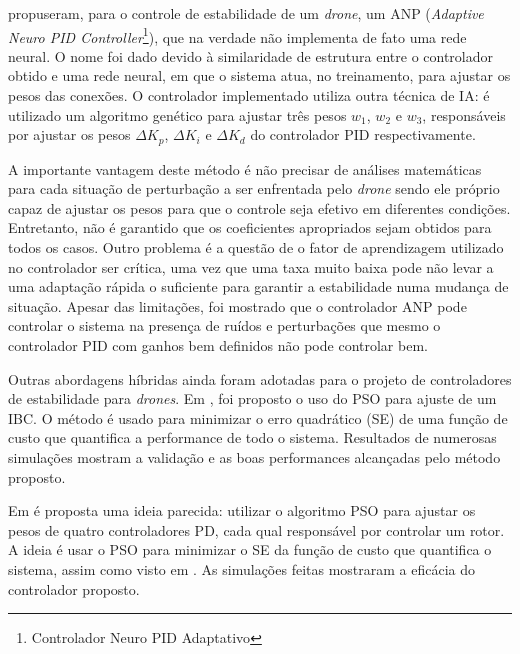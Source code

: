  propuseram, para o controle de estabilidade de um \textit{drone}, um ANP (\textit{Adaptive Neuro PID Controller}\footnote{Controlador Neuro PID Adaptativo}), que na verdade não implementa de fato uma rede neural. O nome foi dado devido à similaridade de estrutura entre o controlador obtido e uma rede neural, em que o sistema atua, no treinamento, para ajustar os pesos das conexões. O controlador implementado utiliza outra técnica de IA: é utilizado um algoritmo genético para ajustar três pesos $w_1$, $w_2$ e $w_3$, responsáveis por ajustar os pesos $\Delta K_p$, $\Delta K_i$ e $\Delta K_d$ do controlador PID respectivamente.

A importante vantagem deste método é não precisar de análises matemáticas para cada situação de perturbação a ser enfrentada pelo \textit{drone} sendo ele próprio capaz de ajustar os pesos para que o controle seja efetivo em diferentes condições. Entretanto, não é garantido que os coeficientes apropriados sejam obtidos para todos os casos. Outro problema é a questão de o fator de aprendizagem utilizado no controlador ser crítica, uma vez que uma taxa muito baixa pode não levar a uma adaptação rápida o suficiente para garantir a estabilidade numa mudança de situação. Apesar das limitações, foi mostrado que o controlador ANP pode controlar o sistema na presença de ruídos e perturbações que mesmo o controlador PID com ganhos bem definidos não pode controlar bem.

Outras abordagens híbridas ainda foram adotadas para o projeto de controladores de estabilidade para \textit{drones}. Em \cite{Yacef2013}, foi proposto o uso do PSO para ajuste de um IBC. O método é usado para minimizar o erro quadrático (SE) de uma função de custo que quantifica a performance de todo o sistema. Resultados de numerosas simulações mostram a validação e as boas performances alcançadas pelo método proposto.

Em \cite{Boubertakh2013} é proposta uma ideia parecida: utilizar o algoritmo PSO para ajustar os pesos de quatro controladores PD, cada qual responsável por controlar um rotor. A ideia é usar o PSO para minimizar o SE da função de custo que quantifica o sistema, assim como visto em \cite{Yacef2013}. As simulações feitas mostraram a eficácia do controlador proposto.